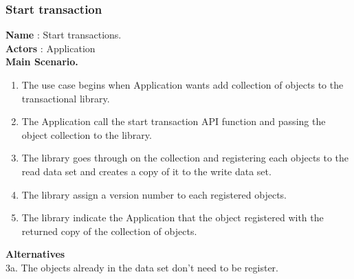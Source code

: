\documentclass[12pt]{article}
\begin{document}
{\subsubsection{Start transaction}
\textbf{Name} : Start transactions.\\
\textbf{Actors} : Application\\
\textbf{Main Scenario.}
\begin{enumerate}
  \item The use case begins when Application wants add collection of objects to the transactional library.
  \item The Application call the start transaction API function and passing the object collection to the library.
  \item The library goes through on the collection and registering each objects to the read data set and creates  a copy of it to the write data set.
  \item The library assign a version number to each registered objects.
  \item The library indicate the Application that the object registered with the returned copy of the collection of objects.
\end{enumerate}
\textbf{Alternatives}\\
3a. The objects already in the data set don't need to be register.\\
}
\end{document}
